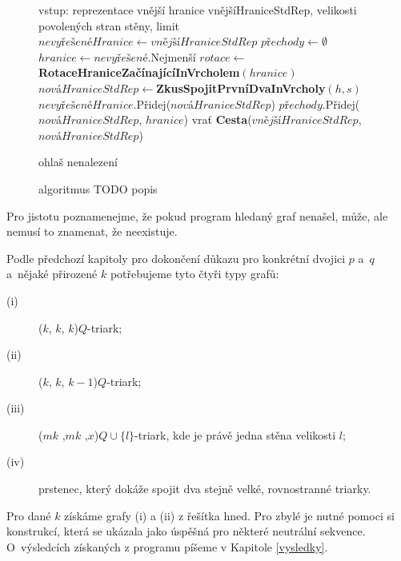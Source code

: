 \begin{figure}

\begin{algorithmic}
  
\State vstup: reprezentace vnější hranice vnějšíHraniceStdRep, velikosti povolených stran stěny, limit
\State $nevyřešenéHranice \gets vnějšíHraniceStdRep	$
\State $přechody \gets \emptyset$ 		
 \State $hranice \gets nevyřešené$.Nejmenší
\State $rotace \gets$ \textbf{RotaceHraniceZačínajícíInVrcholem}$(hranice)$
\State	$nováHraniceStdRep \gets $\textbf{ZkusSpojitPrvníDvaInVrcholy}$(h,s) 	$
\State		$nevyřešenéHranice$.Přidej($nováHraniceStdRep$)
\State		$přechody$.Přidej($nováHraniceStdRep$, $hranice$)
\EndIf
\State		vrať \textbf{Cesta}($vnějšíHraniceStdRep$, $nováHraniceStdRep$)
\EndIf

\EndFor
\EndFor
\EndWhile
\State ohlaš nenalezení
\EndProcedure

\end{algorithmic}
\caption{algoritmus TODO popis}
\end{figure}


Pro jistotu poznamenejme, že pokud program hledaný graf nenašel, může, ale nemusí to znamenat, že neexistuje.


\bigskip

Podle předchozí kapitoly pro dokončení důkazu pro konkrétní dvojici $p$ a~$q$ a~nějaké přirozené $k$ potřebujeme tyto čtyři typy grafů:
\begin{description}
\item[(i)] ($k$, $k$, $k$)$Q$-triark;
\item[(ii)] ($k$, $k$, $k-1$)$Q$-triark;
\item[(iii)] ($mk$ ,$mk$ ,$x$)$Q\cup \lbrace l\rbrace$-triark, kde je právě jedna stěna velikosti $l$;
\item[(iv)] prstenec, který dokáže spojit dva stejně velké, rovnostranné triarky.
\end{description}

Pro dané $k$ získáme grafy (i) a (ii) z řešítka hned. Pro zbylé je nutné pomoci si konstrukcí, která se ukázala jako úspěšná pro některé neutrální sekvence. O~výsledcích získaných z programu píšeme v Kapitole \ref{vysledky}.

